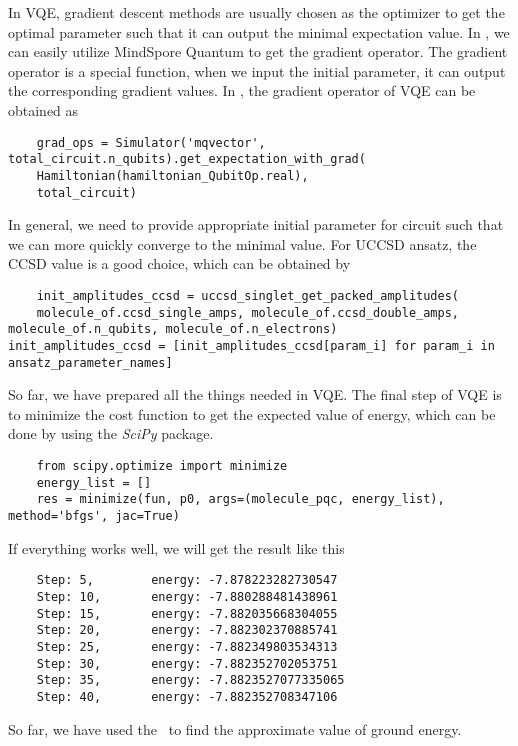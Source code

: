 In VQE, gradient descent methods are usually chosen as the optimizer to get the optimal parameter such that it can output the minimal expectation value.
In \MindQuantum, we can easily utilize MindSpore Quantum to get the gradient operator.
The gradient operator is a special function, when we input the initial parameter, it can output the corresponding gradient values.
In \MindQuantum, the gradient operator of VQE can be obtained as
\begin{lstlisting}
    grad_ops = Simulator('mqvector', total_circuit.n_qubits).get_expectation_with_grad(
    Hamiltonian(hamiltonian_QubitOp.real),
    total_circuit)
\end{lstlisting}
In general, we need to provide appropriate initial parameter for circuit such that we can more quickly converge to the minimal value. For UCCSD ansatz, the CCSD value is a good choice, which can be obtained by
\begin{lstlisting}
    init_amplitudes_ccsd = uccsd_singlet_get_packed_amplitudes(
    molecule_of.ccsd_single_amps, molecule_of.ccsd_double_amps, molecule_of.n_qubits, molecule_of.n_electrons)
init_amplitudes_ccsd = [init_amplitudes_ccsd[param_i] for param_i in ansatz_parameter_names]
\end{lstlisting}
So far, we have prepared all the things needed in VQE.
The final step of VQE is to minimize the cost function to get the expected value of energy, which can be done by using the \textit{SciPy} package.
\begin{lstlisting}
    from scipy.optimize import minimize
    energy_list = []
    res = minimize(fun, p0, args=(molecule_pqc, energy_list), method='bfgs', jac=True)
\end{lstlisting}
If everything works well, we will get the result like this
\begin{lstlisting}
    Step: 5,        energy: -7.878223282730547
    Step: 10,       energy: -7.880288481438961
    Step: 15,       energy: -7.882035668304055
    Step: 20,       energy: -7.882302370885741
    Step: 25,       energy: -7.882349803534313
    Step: 30,       energy: -7.882352702053751
    Step: 35,       energy: -7.8823527077335065
    Step: 40,       energy: -7.882352708347106
\end{lstlisting}
So far, we have used the \MindQuantum\ to find the approximate value of ground energy.